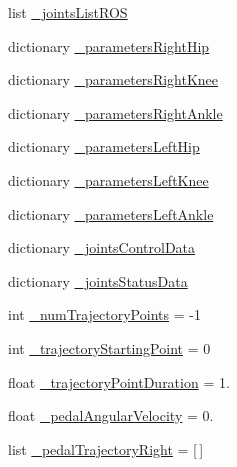 \begin{DoxyCompactItemize}
\item 
list \mbox{\hyperlink{namespacepedal__simulation__old__trajectory_a2e9c40140bd6d6644e667a9184db8ae4}{\+\_\+joints\+List\+R\+OS}}
\item 
dictionary \mbox{\hyperlink{namespacepedal__simulation__old__trajectory_a73cd0c447d93f000cef36f979ead5765}{\+\_\+parameters\+Right\+Hip}}
\item 
dictionary \mbox{\hyperlink{namespacepedal__simulation__old__trajectory_a250dd9a40129025d0939e4aa3cfc510f}{\+\_\+parameters\+Right\+Knee}}
\item 
dictionary \mbox{\hyperlink{namespacepedal__simulation__old__trajectory_a56dcc8631eff5584d2e1d13ca00d9ba9}{\+\_\+parameters\+Right\+Ankle}}
\item 
dictionary \mbox{\hyperlink{namespacepedal__simulation__old__trajectory_ae7b06e0811ca2ccc5128ca4355bf57a2}{\+\_\+parameters\+Left\+Hip}}
\item 
dictionary \mbox{\hyperlink{namespacepedal__simulation__old__trajectory_aab442f98e55ff7c436438382e32403f8}{\+\_\+parameters\+Left\+Knee}}
\item 
dictionary \mbox{\hyperlink{namespacepedal__simulation__old__trajectory_a3a9eb71a533660eb94bc5344a078f39d}{\+\_\+parameters\+Left\+Ankle}}
\item 
dictionary \mbox{\hyperlink{namespacepedal__simulation__old__trajectory_a4d1c56426c38bd60f1a520111e939753}{\+\_\+joints\+Control\+Data}}
\item 
dictionary \mbox{\hyperlink{namespacepedal__simulation__old__trajectory_a05a33c2106b6be6a409e239ca68c7df6}{\+\_\+joints\+Status\+Data}}
\item 
int \mbox{\hyperlink{namespacepedal__simulation__old__trajectory_ad8a2fe1a3e5fd1f5eaedd704129215fe}{\+\_\+num\+Trajectory\+Points}} = -\/1
\item 
int \mbox{\hyperlink{namespacepedal__simulation__old__trajectory_a98ba33de5fd79c7de67853a94c10bfd5}{\+\_\+trajectory\+Starting\+Point}} = 0
\item 
float \mbox{\hyperlink{namespacepedal__simulation__old__trajectory_a20fd172822a257cd76194e455275c8f0}{\+\_\+trajectory\+Point\+Duration}} = 1.
\item 
float \mbox{\hyperlink{namespacepedal__simulation__old__trajectory_af57e55890376bc80519fb8d3cd7077d8}{\+\_\+pedal\+Angular\+Velocity}} = 0.
\item 
list \mbox{\hyperlink{namespacepedal__simulation__old__trajectory_a69b8bab78172e6773e0569a9d8ca1590}{\+\_\+pedal\+Trajectory\+Right}} = \mbox{[}$\,$\mbox{]}

\end{DoxyCompactItemize}
